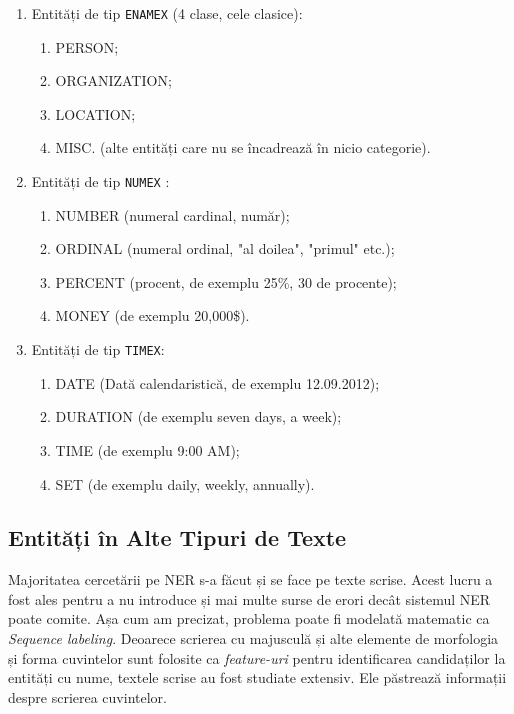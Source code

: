 \begin{enumerate}
	\item Entități de tip \texttt{ENAMEX} (4 clase, cele clasice):
	\begin{enumerate}
		\item PERSON;
		\item ORGANIZATION;
		\item LOCATION;
		\item MISC. (alte entități care nu se încadrează în nicio categorie).
	\end{enumerate}


	\item Entități de tip \texttt{NUMEX} :

	\begin{enumerate}
		\item NUMBER (numeral cardinal, număr);
		\item ORDINAL (numeral ordinal, "al doilea", "primul" etc.);
		\item PERCENT (procent, de exemplu 25\%, 30 de procente);
		\item MONEY (de exemplu 20,000\$).
	\end{enumerate}
	
		\item Entități de tip \texttt{TIMEX}: 
	
		\begin{enumerate}
			\item DATE (Dată calendaristică, de exemplu 12.09.2012);
			\item DURATION (de exemplu seven days, a week);
			\item TIME (de exemplu 9:00 AM);
			\item SET (de exemplu daily, weekly, annually).
		\end{enumerate}


\end{enumerate}

\subsection{Entități în Alte Tipuri de Texte}

Majoritatea cercetării pe NER s-a făcut și se face pe texte scrise. Acest lucru a fost ales pentru a nu introduce și mai multe surse de erori decât sistemul NER poate comite. Așa cum am precizat, problema poate fi modelată matematic ca \textit{Sequence labeling}. Deoarece scrierea cu majusculă și alte elemente de morfologia și forma cuvintelor sunt folosite ca \textit{feature-uri} pentru identificarea candidaților la entități cu nume, textele scrise au fost studiate extensiv. Ele păstrează informații despre scrierea cuvintelor.

